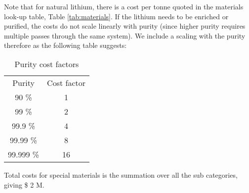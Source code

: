 Note that for natural lithium, there is a cost per tonne quoted in the materials look-up table, Table \ref{tab:materials}.  If the lithium needs to be enriched or purified, the costs do not scale linearly with purity (since higher purity requires multiple passes through the same system).  We include a scaling with the purity therefore as the following table suggests:

\begin{table}[]
    \centering
    \begin{tabular}{c|c}
       Purity  &  Cost factor \\
       90 \%  &  1 \\
       99 \%  &  2 \\
       99.9 \%  &  4 \\
       99.99 \%  &  8 \\
       99.999 \%  &  16 \\
    \end{tabular}
    \caption{Purity cost factors}
    \label{tab:my_label}
\end{table}

Total costs for special materials is the summation over all the sub categories, giving \$ 2 M.  



